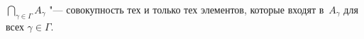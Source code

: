 
$\bigcap\limits_{\gamma\in \Gamma} A_{\gamma}$ "--- совокупность тех и только тех элементов,
 которые входят в~$A_\gamma$ для всех $\gamma\in\Gamma$.
